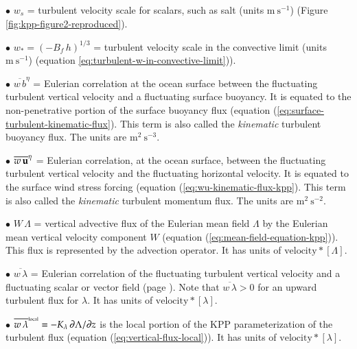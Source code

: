 \begin{mdframed}[backgroundcolor=lightgray!50]
\begin{trivlist}
\item[$\bullet$] $w_{s}$ = turbulent velocity scale for scalars, such
  as salt (units $\mbox{m}~\mbox{s}^{-1}$) (Figure
  \ref{fig:kpp-figure2-reproduced}).

\item[$\bullet$] $w_{*} = (-B_{f} \, h)^{1/3}$ = turbulent velocity
  scale in the convective limit (units $\mbox{m}~\mbox{s}^{-1}$)
  (equation \ref{eq:turbulent-w-in-convective-limit})).

\item[$\bullet$] $\overline{w \, b}^{\eta}$ = Eulerian correlation at
  the ocean surface between the fluctuating turbulent vertical
  velocity and a fluctuating surface buoyancy. It is equated to the
  non-penetrative portion of the surface buoyancy flux (equation
  (\ref{eq:surface-turbulent-kinematic-flux}).  This term is also
  called the {\it kinematic} turbulent buoyancy flux.  The units are
  $\mbox{m}^{2}~\mbox{s}^{-3}$.

\item[$\bullet$] $\overline{w \, {\bf u}}^{\eta}$ = Eulerian
  correlation, at the ocean surface, between the fluctuating turbulent
  vertical velocity and the fluctuating horizontal velocity. It is
  equated to the surface wind stress forcing (equation
  (\ref{eq:wu-kinematic-flux-kpp}).  This term is also called the {\it
    kinematic} turbulent momentum flux.  The units are
  $\mbox{m}^{2}~\mbox{s}^{-2}$.

\item[$\bullet$] $W \, \Lambda$ = vertical advective flux of the Eulerian mean
  field $\Lambda$ by the Eulerian mean vertical velocity component $W$
  (equation (\ref{eq:mean-field-equation-kpp})). This flux is
  represented by the advection operator.  It has units of
  $\mbox{velocity} * [\Lambda]$.

\item[$\bullet$] $\overline{w \, \lambda}$ = Eulerian correlation of the
  fluctuating turbulent vertical velocity and a fluctuating scalar or
  vector field (page \pageref{correlation_defined}).  Note that
  $\overline{w \, \lambda} > 0$ for an upward turbulent flux for
  $\lambda$.  It has units of $\mbox{velocity} * [\lambda]$.

\item[$\bullet$] $\overline{w \, \lambda}^{\mbox{\tiny local}} = -K_{\lambda}
  \, \partial \Lambda / \partial z$ is the local portion of the KPP
  parameterization of the turbulent flux (equation
  (\ref{eq:vertical-flux-local})).  It has units of $\mbox{velocity}
  * [\lambda]$.


\end{trivlist}
\end{mdframed}
